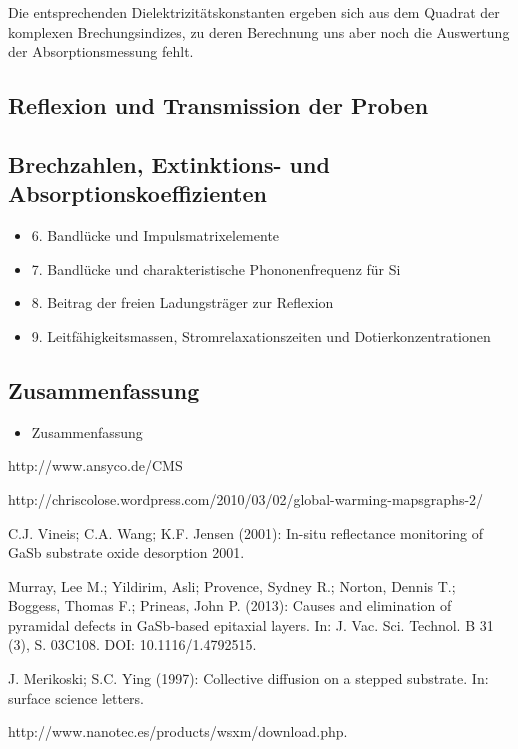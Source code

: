 \documentclass[paper=a4,fontsize=10pt,DIV=18,twocolumn,parskip=half]{scrartcl}
\numberwithin{equation}{section}    %
\begin{document}
Die entsprechenden Dielektrizitätskonstanten ergeben sich aus dem Quadrat der komplexen Brechungsindizes, 
zu deren Berechnung uns aber noch die Auswertung der Absorptionsmessung fehlt.

\subsection{Reflexion und Transmission der Proben}

\subsection{Brechzahlen, Extinktions- und Absorptionskoeffizienten}

\begin{itemize}
\item 6. Bandlücke und Impulsmatrixelemente
\item 7. Bandlücke und charakteristische Phononenfrequenz für Si
\item 8. Beitrag der freien Ladungsträger zur Reflexion
\item 9. Leitfähigkeitsmassen, Stromrelaxationszeiten und Dotierkonzentrationen
\end{itemize}


\subsection{Zusammenfassung}
\begin{itemize}
\item Zusammenfassung
\end{itemize}

\begin{thebibliography}{}   

 http://www.ansyco.de/CMS

 http://chriscolose.wordpress.com/2010/03/02/global-warming-mapsgraphs-2/

 C.J. Vineis; C.A. Wang; K.F. Jensen (2001): In-situ reflectance 
monitoring of GaSb substrate oxide desorption 2001.

 Murray, Lee M.; Yildirim, Asli; Provence, Sydney R.; Norton, 
Dennis T.; Boggess, Thomas F.; Prineas, John P. (2013): Causes and elimination 
of pyramidal defects in GaSb-based epitaxial layers. In: J. Vac. Sci. Technol. B 
31 (3), S. 03C108. DOI: 10.1116/1.4792515.
  
 J. Merikoski; S.C. Ying (1997): Collective diffusion on a stepped substrate. In: surface science letters.

 http://www.nanotec.es/products/wsxm/download.php. 
\end{thebibliography}
\end{document}
